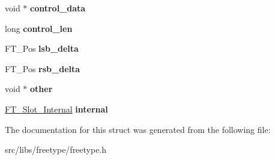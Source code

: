\begin{DoxyCompactItemize}
\item 
\hypertarget{struct_f_t___glyph_slot_rec___a2af67814d985bcdfcffdf7e8a36ebbdf}{
void $\ast$ {\bfseries control\_\-data}}
\label{struct_f_t___glyph_slot_rec___a2af67814d985bcdfcffdf7e8a36ebbdf}

\item 
\hypertarget{struct_f_t___glyph_slot_rec___a7a088255cb09abe42f19f650f48b6b3f}{
long {\bfseries control\_\-len}}
\label{struct_f_t___glyph_slot_rec___a7a088255cb09abe42f19f650f48b6b3f}

\item 
\hypertarget{struct_f_t___glyph_slot_rec___a7d0d8c2eda28e38541e953186ecab89a}{
FT\_\-Pos {\bfseries lsb\_\-delta}}
\label{struct_f_t___glyph_slot_rec___a7d0d8c2eda28e38541e953186ecab89a}

\item 
\hypertarget{struct_f_t___glyph_slot_rec___a2ca5f5e7b92df3aee4584949fa6a2a1c}{
FT\_\-Pos {\bfseries rsb\_\-delta}}
\label{struct_f_t___glyph_slot_rec___a2ca5f5e7b92df3aee4584949fa6a2a1c}

\item 
\hypertarget{struct_f_t___glyph_slot_rec___ad0c5ab51842f178ba571bab2874f1bdb}{
void $\ast$ {\bfseries other}}
\label{struct_f_t___glyph_slot_rec___ad0c5ab51842f178ba571bab2874f1bdb}

\item 
\hypertarget{struct_f_t___glyph_slot_rec___a91731fd527eeab1d1acf3e1aea4bea84}{
\hyperlink{struct_f_t___slot___internal_rec__}{FT\_\-Slot\_\-Internal} {\bfseries internal}}
\label{struct_f_t___glyph_slot_rec___a91731fd527eeab1d1acf3e1aea4bea84}

\end{DoxyCompactItemize}


The documentation for this struct was generated from the following file:\begin{DoxyCompactItemize}
\item 
src/libs/freetype/freetype.h\end{DoxyCompactItemize}
